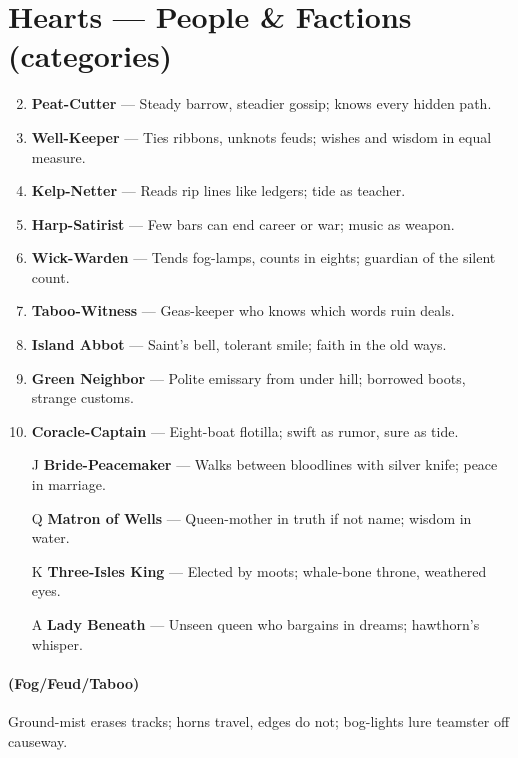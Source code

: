 \section*{Hearts --- People \& Factions (categories)}
\label{sec:theona-people}
\begin{enumerate}
\setcounter{enumi}{1}
\item \textbf{Peat-Cutter} --- Steady barrow, steadier gossip; knows every hidden path.
\item \textbf{Well-Keeper} --- Ties ribbons, unknots feuds; wishes and wisdom in equal measure.
\item \textbf{Kelp-Netter} --- Reads rip lines like ledgers; tide as teacher.
\item \textbf{Harp-Satirist} --- Few bars can end career or war; music as weapon.
\item \textbf{Wick-Warden} --- Tends fog-lamps, counts in eights; guardian of the silent count.
\item \textbf{Taboo-Witness} --- Geas-keeper who knows which words ruin deals.
\item \textbf{Island Abbot} --- Saint's bell, tolerant smile; faith in the old ways.
\item \textbf{Green Neighbor} --- Polite emissary from under hill; borrowed boots, strange customs.
\item \textbf{Coracle-Captain} --- Eight-boat flotilla; swift as rumor, sure as tide.
\item[J] \textbf{Bride-Peacemaker} --- Walks between bloodlines with silver knife; peace in marriage.
\item[Q] \textbf{Matron of Wells} --- Queen-mother in truth if not name; wisdom in water.
\item[K] \textbf{Three-Isles King} --- Elected by moots; whale-bone throne, weathered eyes.
\item[A] \textbf{Lady Beneath} --- Unseen queen who bargains in dreams; hawthorn's whisper.
\end{enumerate}

\paragraph*{(Fog/Feud/Taboo)} Ground-mist erases tracks; horns travel, edges do not; bog-lights lure teamster off causeway.


